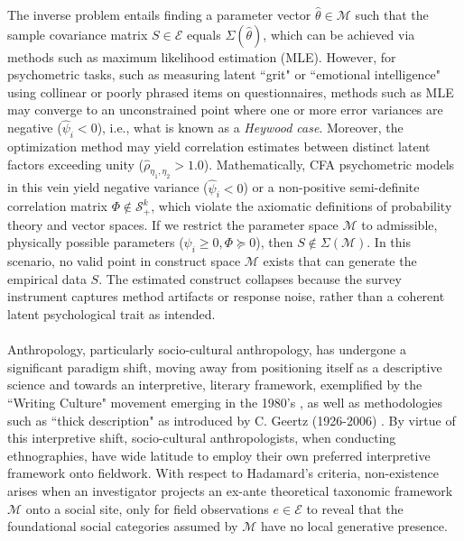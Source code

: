\documentclass{article}
\theoremstyle{definition}
\begin{document}
\noindent
The inverse problem entails finding a parameter vector $\hat{\theta} \in \mathcal{M}$ such that the sample covariance matrix $S \in \mathcal{E}$ equals $\Sigma(\hat{\theta})$, which can be achieved via methods such as maximum likelihood estimation (MLE). However, for psychometric tasks, such as measuring latent ``grit" or ``emotional intelligence" using collinear or poorly phrased items on questionnaires, methods such as MLE may converge to an unconstrained point where one or more error variances are negative ($\hat{\psi}_i < 0$), i.e., what is known as a \textit{Heywood case}. Moreover, the optimization method may yield correlation estimates between distinct latent factors exceeding unity ($\hat{\rho}_{\eta_1, \eta_2} > 1.0$). Mathematically, CFA psychometric models in this vein yield negative variance ($\hat{\psi}_i < 0$) or a non-positive semi-definite correlation matrix $\Phi \notin \mathcal{S}_+^k$, which violate the axiomatic definitions of probability theory and vector spaces. If we restrict the parameter space $\mathcal{M}$ to admissible, physically possible parameters ($\psi_i \ge 0, \Phi \succeq 0$), then $S \notin \Sigma(\mathcal{M})$. In this scenario, no valid point in construct space $\mathcal{M}$ exists that can generate the empirical data $S$. The estimated construct collapses because the survey instrument captures method artifacts or response noise, rather than a coherent latent psychological trait as intended. \\
\\
Anthropology, particularly socio-cultural anthropology, has undergone a significant paradigm shift, moving away from positioning itself as a descriptive science and towards an interpretive, literary framework, exemplified by the ``Writing Culture" movement emerging in the 1980's \cite{MC86}, as well as methodologies such as ``thick description" as introduced by C. Geertz (1926-2006) \cite{Gee73}. By virtue of this interpretive shift, socio-cultural anthropologists, when conducting ethnographies, have wide latitude to employ their own preferred interpretive framework onto fieldwork. With respect to Hadamard's criteria, non-existence arises when an investigator projects an ex-ante theoretical taxonomic framework $\mathcal{M}$ onto a social site, only for field observations $e \in \mathcal{E}$ to reveal that the foundational social categories assumed by $\mathcal{M}$ have no local generative presence. \\
\\
\end{document}
